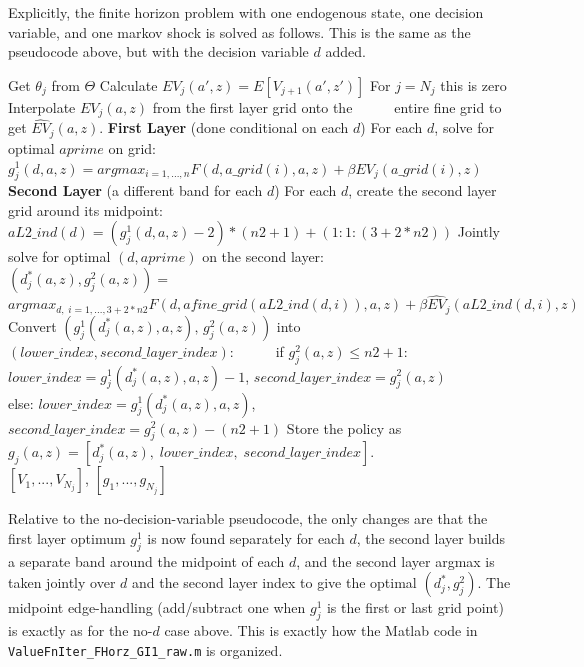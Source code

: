 \documentclass[11pt,fleqn]{article}
\begin{document}
Explicitly, the finite horizon problem with one endogenous state, one decision variable, and one markov shock is solved as follows. This is the same as the pseudocode above, but with the decision variable $d$ added.
\begin{algorithmic}
   \State Get $\theta_j$ from $\Theta$
    \State Calculate $EV_j(a',z)=E[V_{j+1}(a',z')]$ \Comment For $j=N_j$ this is zero
    \State Interpolate $EV_j(a,z)$ from the first layer grid onto the
    \State $\quad$ $\quad$ entire fine grid to get $\hat{EV}_j(a,z)$.
     \State \textbf{First Layer} (done conditional on each $d$)
     \State For each $d$, solve for optimal $aprime$ on grid:
     \State $\quad$ $\quad$ $g^1_{j}(d,a,z)=argmax_{i=1,...,n} F(d,a\_{}grid(i),a,z) + \beta EV_j(a\_{}grid(i),z)$
     \State \textbf{Second Layer} (a different band for each $d$)
     \State For each $d$, create the second layer grid around its midpoint:
     \State $\quad$ $\quad$ $aL2\_{}ind(d)=(g^1_j(d,a,z)-2)*(n2+1)+(1:1:(3+2*n2))$
     \State Jointly solve for optimal $(d,aprime)$ on the second layer:
     \State $\quad$ $\quad$ $(d^*_j(a,z),g^2_j(a,z))=$
     \State $\quad$ $\quad$ $\quad$ $argmax_{d,\;i=1,...,3+2*n2} F(d,afine\_{}grid(aL2\_{}ind(d,i)),a,z) + \beta \hat{EV}_j(aL2\_{}ind(d,i),z)$
    \EndFor
   \EndFor
  \EndFor
  \State Convert $(g^1_j(d^*_j(a,z),a,z),\, g^2_j(a,z))$ into $(lower\_{}index, second\_{}layer\_{}index)$:
  \State $\quad$ $\quad$ if $g^2_j(a,z) \leq n2+1$: $lower\_{}index=g^1_j(d^*_j(a,z),a,z)-1$, $second\_{}layer\_{}index=g^2_j(a,z)$
  \State $\quad$ $\quad$ else: $lower\_{}index=g^1_j(d^*_j(a,z),a,z)$, $second\_{}layer\_{}index=g^2_j(a,z)-(n2+1)$
  \State Store the policy as $g_j(a,z)=[d^*_j(a,z),\;lower\_{}index,\;second\_{}layer\_{}index]$.
  \\ \Return $[V_1,...,V_{N_j}]$, $[g_1,...,g_{N_j}]$
\end{algorithmic}
Relative to the no-decision-variable pseudocode, the only changes are that the first layer optimum $g^1_j$ is now found separately for each $d$, the second layer builds a separate band around the midpoint of each $d$, and the second layer argmax is taken jointly over $d$ and the second layer index to give the optimal $(d^*_j,g^2_j)$. The midpoint edge-handling (add/subtract one when $g^1_j$ is the first or last grid point) is exactly as for the no-$d$ case above. This is exactly how the Matlab code in \texttt{ValueFnIter\_{}FHorz\_{}GI1\_{}raw.m} is organized.
\end{document}
